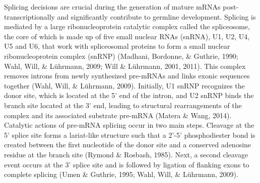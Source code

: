 \documentclass[12pt,oneside]{reedthesis}
\begin{document}
Splicing decisions are crucial during the generation of mature mRNAs
post-transcriptionally and significantly contribute to germline
development. Splicing is mediated by a large ribonucleoprotein catalytic
complex called the spliceosome, the core of which is made up of five
small nuclear RNAs (snRNA), U1, U2, U4, U5 and U6, that work with
spliceosomal proteins to form a small nuclear ribonucleoprotein complex
(snRNP) (Madhani, Bordonne, \& Guthrie, 1990; Wahl, Will, \& Lührmann, 2009; Will \& Lührmann, 2001, 2011). This
complex removes introns from newly synthesized pre-mRNAs and links
exonic sequences together (Wahl, Will, \& Lührmann, 2009). Initially, U1 snRNP recognizes
the donor site, which is located at the 5' end of the intron, and U2
snRNP binds the branch site located at the 3' end, leading to structural
rearrangements of the complex and its associated substrate pre-mRNA
(Matera \& Wang, 2014). Catalytic actions of pre-mRNA splicing occur in two
main steps. Cleavage at the 5' splice site forms a lariat-like structure
such that a 2'-5' phosphodiester bond is created between the first
nucleotide of the donor site and a conserved adenosine residue at the
branch site (Rymond \& Rosbash, 1985). Next, a second cleavage event occurs at
the 3' splice site and is followed by ligation of flanking exons to
complete splicing (Umen \& Guthrie, 1995; Wahl, Will, \& Lührmann, 2009).
\end{document}
